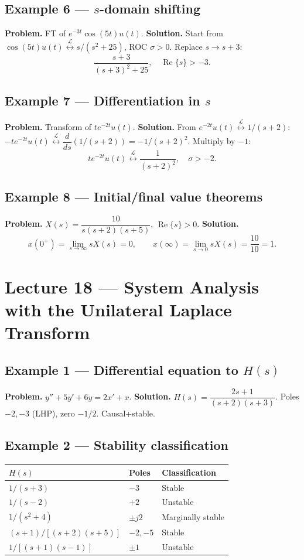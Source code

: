 \documentclass[11pt]{article}
\newcommand{\Real}{\operatorname{Re}}
\newcommand{\Lap}{\overset{\mathcal{L}}{\longleftrightarrow}}
\begin{document}
\subsection{Example 6 --- $s$-domain shifting}
\textbf{Problem.} FT of $e^{-3t}\cos(5t)u(t)$.
\textbf{Solution.} Start from $\cos(5t)u(t)\Lap s/(s^2+25)$, ROC $\sigma>0$. Replace $s\to s+3$:
\[\frac{s+3}{(s+3)^2+25},\quad\Real\{s\}>-3.\]

\subsection{Example 7 --- Differentiation in $s$}
\textbf{Problem.} Transform of $te^{-2t}u(t)$.
\textbf{Solution.} From $e^{-2t}u(t)\Lap 1/(s+2)$: $-te^{-2t}u(t)\Lap\dfrac{d}{ds}(1/(s+2))=-1/(s+2)^2$. Multiply by $-1$:
\[te^{-2t}u(t)\Lap\frac{1}{(s+2)^2},\quad\sigma>-2.\]

\subsection{Example 8 --- Initial/final value theorems}
\textbf{Problem.} $X(s)=\dfrac{10}{s(s+2)(s+5)}$, $\Real\{s\}>0$.
\textbf{Solution.}
\[x(0^+)=\lim_{s\to\infty}sX(s)=0,\qquad x(\infty)=\lim_{s\to 0}sX(s)=\frac{10}{10}=1.\]

\section{Lecture 18 --- System Analysis with the Unilateral Laplace Transform}

\subsection{Example 1 --- Differential equation to $H(s)$}
\textbf{Problem.} $y''+5y'+6y=2x'+x$.
\textbf{Solution.} $H(s)=\dfrac{2s+1}{(s+2)(s+3)}$. Poles $-2,-3$ (LHP), zero $-1/2$. Causal+stable.

\subsection{Example 2 --- Stability classification}
\begin{center}
\begin{tabular}{l l l}
\hline
$H(s)$ & Poles & Classification\\
\hline
$1/(s+3)$ & $-3$ & Stable\\
$1/(s-2)$ & $+2$ & Unstable\\
$1/(s^2+4)$ & $\pm j2$ & Marginally stable\\
$(s+1)/[(s+2)(s+5)]$ & $-2,-5$ & Stable\\
$1/[(s+1)(s-1)]$ & $\pm 1$ & Unstable\\
\hline
\end{tabular}
\end{center}
\end{document}

